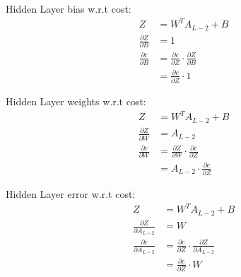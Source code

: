 Hidden Layer bias w.r.t cost:
\begin{equation}
    \begin{aligned}
        Z &= W^{T}A_{L-2} + B\\
        \frac{\partial Z}{\partial B} &= 1\\[2em]
        \frac{\partial c}{\partial B} &= \frac{\partial c}{\partial Z} \cdot \frac{\partial Z}{\partial B}\\
                                      &= \frac{\partial c}{\partial Z} \cdot 1
    \end{aligned}
\end{equation}

Hidden Layer weights w.r.t cost:
\begin{equation}
    \begin{aligned}
        Z &= W^{T}A_{L-2} + B\\
        \frac{\partial Z}{\partial W} &= A_{L-2}\\[2em]
        \frac{\partial c}{\partial W} &= \frac{\partial Z}{\partial W} \cdot \frac{\partial c}{\partial Z}\\
                                      &= A_{L-2} \cdot \frac{\partial c}{\partial Z}
    \end{aligned}
\end{equation}

Hidden Layer error w.r.t cost:
\begin{equation}
    \begin{aligned}
        Z &= W^{T}A_{L-2} + B\\
        \frac{\partial Z}{\partial A_{L-2}} &= W\\[2em]
        \frac{\partial c}{\partial A_{L-2}} &= \frac{\partial c}{\partial Z} \cdot \frac{\partial Z}{\partial A_{L-2}}\\
                                      &= \frac{\partial c}{\partial Z} \cdot W
    \end{aligned}
\end{equation}

